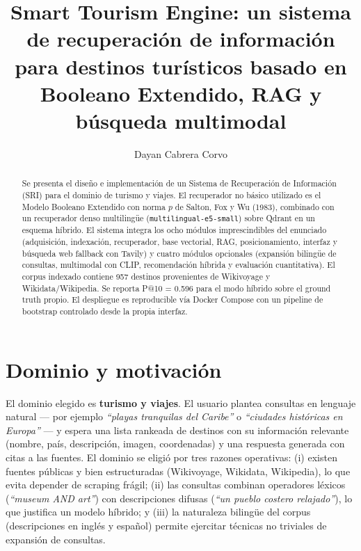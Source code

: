 \documentclass[runningheads,a4paper]{llncs}
\begin{document}
\mainmatter

\title{Smart Tourism Engine: un sistema de recuperaci\'on de informaci\'on para destinos tur\'isticos basado en Booleano Extendido, RAG y b\'usqueda multimodal}

\author{Dayan Cabrera Corvo}

\maketitle

\begin{abstract}
Se presenta el dise\~no e implementaci\'on de un Sistema de Recuperaci\'on de Informaci\'on (SRI) para el dominio de turismo y viajes. El recuperador no b\'asico utilizado es el Modelo Booleano Extendido con norma $p$ de Salton, Fox y Wu (1983), combinado con un recuperador denso multilingüe (\texttt{multilingual-e5-small}) sobre Qdrant en un esquema h\'ibrido. El sistema integra los ocho m\'odulos imprescindibles del enunciado (adquisici\'on, indexaci\'on, recuperador, base vectorial, RAG, posicionamiento, interfaz y b\'usqueda web fallback con Tavily) y cuatro m\'odulos opcionales (expansi\'on bilingüe de consultas, multimodal con CLIP, recomendaci\'on h\'ibrida y evaluaci\'on cuantitativa). El corpus indexado contiene 957 destinos provenientes de Wikivoyage y Wikidata/Wikipedia. Se reporta P@10 = 0.596 para el modo h\'ibrido sobre el ground truth propio. El despliegue es reproducible v\'ia Docker Compose con un pipeline de bootstrap controlado desde la propia interfaz.
\end{abstract}

\section{Dominio y motivaci\'on}

El dominio elegido es \textbf{turismo y viajes}. El usuario plantea consultas en lenguaje natural --- por ejemplo \emph{``playas tranquilas del Caribe''} o \emph{``ciudades hist\'oricas en Europa''} --- y espera una lista rankeada de destinos con su informaci\'on relevante (nombre, pa\'is, descripci\'on, imagen, coordenadas) y una respuesta generada con citas a las fuentes. El dominio se eligi\'o por tres razones operativas: (i) existen fuentes p\'ublicas y bien estructuradas (Wikivoyage, Wikidata, Wikipedia), lo que evita depender de scraping fr\'agil; (ii) las consultas combinan operadores l\'exicos (\emph{``museum AND art''}) con descripciones difusas (\emph{``un pueblo costero relajado''}), lo que justifica un modelo h\'ibrido; y (iii) la naturaleza bilingüe del corpus (descripciones en ingl\'es y espa\~nol) permite ejercitar t\'ecnicas no triviales de expansi\'on de consultas.
\end{document}
